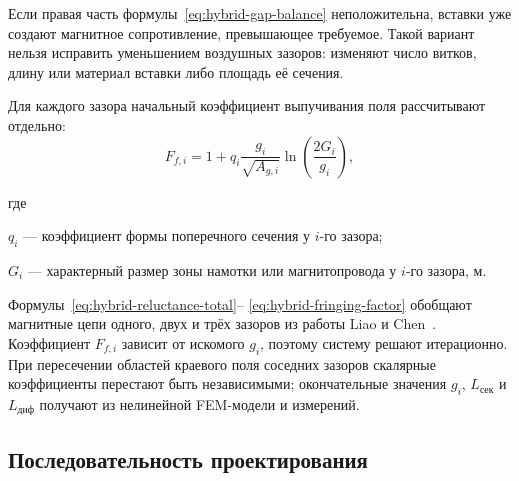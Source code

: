 \documentclass[14pt,a4paper]{extarticle}
\newenvironment{whereblock}
 {\par\noindent где\par
  \begin{list}{}{\setlength{\leftmargin}{12.5mm}
                  \setlength{\itemindent}{-12.5mm}
                  \setlength{\itemsep}{0pt}
                  \setlength{\parsep}{0pt}
                  \setlength{\topsep}{0pt}}}
 {\end{list}}
\newcommand{\whereitem}[2]{\item[] #1 --- #2}
\begin{document}
Если правая часть формулы~\eqref{eq:hybrid-gap-balance} неположительна,
вставки уже создают магнитное сопротивление, превышающее требуемое. Такой
вариант нельзя исправить уменьшением воздушных зазоров: изменяют число
витков, длину или материал вставки либо площадь её сечения.

Для каждого зазора начальный коэффициент выпучивания поля рассчитывают
отдельно:
\begin{equation}
 F_{f,i}=1+q_i\frac{g_i}{\sqrt{A_{g,i}}}
 \ln\left(\frac{2G_i}{g_i}\right),
 \label{eq:hybrid-fringing-factor}
\end{equation}
\begin{whereblock}
\whereitem{$q_i$}{коэффициент формы поперечного сечения у $i$-го зазора;}
\whereitem{$G_i$}{характерный размер зоны намотки или магнитопровода у
$i$-го зазора, м.}
\end{whereblock}

Формулы~\eqref{eq:hybrid-reluctance-total}--
\eqref{eq:hybrid-fringing-factor} обобщают магнитные цепи одного, двух и
трёх зазоров из работы Liao и Chen~\cite[формулы~(3)--(21)]{liao}.
Коэффициент $F_{f,i}$ зависит от искомого $g_i$, поэтому систему решают
итерационно. При пересечении областей краевого поля соседних зазоров
скалярные коэффициенты перестают быть независимыми; окончательные значения
$g_i$, $L_{\text{сек}}$ и $L_{\text{диф}}$ получают из нелинейной FEM-модели
и измерений.

\subsection{Последовательность проектирования}
\end{document}
